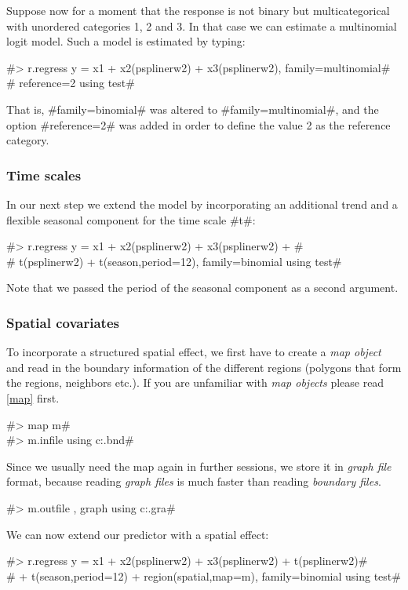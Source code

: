 Suppose now for a moment that the response is not binary but
multicategorical with unordered categories 1, 2 and 3. In that
case we can estimate a multinomial logit model. Such a model is
estimated by typing:

 #> r.regress y = x1 + x2(psplinerw2) + x3(psplinerw2), family=multinomial#\\
 #  reference=2 using test#

That is, #family=binomial# was altered to #family=multinomial#,
and the option #reference=2# was added in order to define the
value 2 as the reference category.

\subsubsection*{Time scales}

In our next step we extend the model by incorporating an
additional trend and a flexible seasonal component for the time
scale #t#:

 #> r.regress y = x1 + x2(psplinerw2) + x3(psplinerw2) +  #\\
 #  t(psplinerw2) + t(season,period=12), family=binomial using test#

Note that we passed the period of the seasonal component as a
second argument.

\subsubsection*{Spatial covariates}

To incorporate a structured spatial effect, we first have to
create a {\em map object} and read in the boundary information of
the different regions (polygons that form the regions, neighbors
etc.). If you are unfamiliar with {\em map objects} please read
\autoref{map} first.

#> map m# \\
#> m.infile using c:\maps\map.bnd#

Since we usually need the map again in further sessions, we store
it in {\em graph file} format, because reading {\em graph files}
is much faster than reading {\em boundary files}.

#> m.outfile , graph using c:\maps\mapgraph.gra#

We can now extend our predictor with a spatial effect:

 #> r.regress y = x1 + x2(psplinerw2) + x3(psplinerw2) + t(psplinerw2)#\\
 #  + t(season,period=12) + region(spatial,map=m), family=binomial using test#

